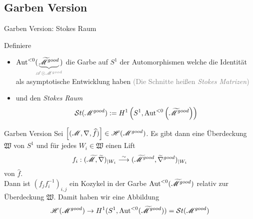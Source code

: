 \subsection{Garben Version}
\begin{frame}[t]{Garben Version: Stokes Raum}
  \begin{defn}
    Definiere
    \begin{itemize}
      \item $\Aut^{<0}(\!\!\textcolor{gray}{\underset{\sA\otimes\sM^{good}}
        {\underbrace{\textcolor{black}{\tilde\sM^{good}}}}}\!\!)$
        die Garbe auf $S^1$ der Automorphismen welche die Identität als
        asymptotische Entwicklung haben
        \textcolor{gray}{(Die Schnitte heißen \emph{Stokes Matrizen})}
      \item<2-3> und den \emph{Stokes Raum}
        \[
          \mathcal{S}{}t(\mathscr{M}^{good})
          :=H^1\left(S^1,\operatorname{Aut}^{<0}\left(\widetilde {\mathscr{M}}^{good}\right)\right)
        \]
    \end{itemize}
  \end{defn}
\end{frame}
\begin{frame}[t]{Garben Version}
  Sei $\left[(\mathscr{M},\nabla,\widehat f)\right]\in\mathscr{H}(\mathscr{M}^{good})$. 
  Es gibt dann eine Überdeckung $\mathfrak{W}$ von $S^1$ und für jedes
  $W_i\in\mathfrak{W}$ einen Lift
  \[
    f_i:(\widetilde{\mathscr{M}},\widetilde\nabla)_{|W_i}
    \overset{\sim}{\longrightarrow}
    (\widetilde{\mathscr{M}}^{good},\widetilde\nabla^{good})_{|W_i}
  \]
  von $\hat f$.
  \\Dann ist $(f_jf_i^{-1})_{i,j}$ ein Kozykel in der Garbe
  $\operatorname{Aut}^{<0}(\widetilde{\mathscr{M}}^{good})$ relativ zur Überdeckung $\mathfrak{W}$.
  Damit haben wir eine Abbildung
  \[
    \mathscr{H}(\mathscr{M}^{good})\to H^1(S^1,\operatorname{Aut}^{<0}(\widetilde{\mathscr{M}}^{good}))=\mathcal{S}{}t(\mathscr{M}^{good})
  \]
\end{frame}

